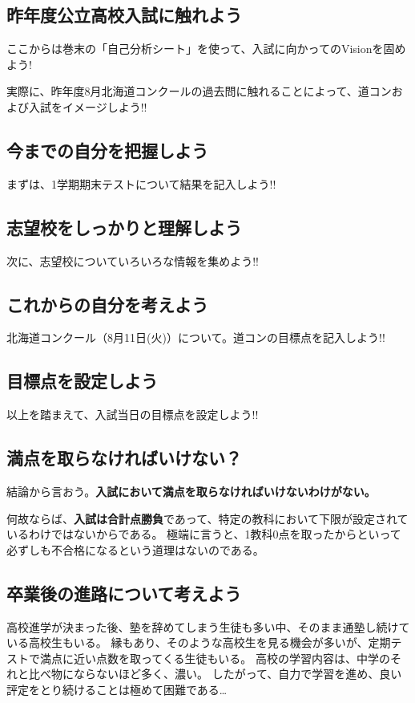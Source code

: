   \subsection{\textbf{昨年度公立高校入試に触れよう}}
    ここからは巻末の「自己分析シート」を使って、入試に向かってのVisionを固めよう!

    実際に、昨年度8月北海道コンクールの過去問に触れることによって、道コンおよび入試をイメージしよう!!

  \subsection{\textbf{今までの自分を把握しよう}}
    まずは、1学期期末テストについて結果を記入しよう!!

  \subsection{\textbf{志望校をしっかりと理解しよう}}
    次に、志望校についていろいろな情報を集めよう!!

\subsection{\textbf{これからの自分を考えよう}}
    北海道コンクール（8月11日(火)）について。道コンの目標点を記入しよう!!

  \subsection{\textbf{目標点を設定しよう}}
  以上を踏まえて、入試当日の目標点を設定しよう!!

\subsection{\textbf{満点を取らなければいけない？}}
  結論から言おう。\textbf{入試において満点を取らなければいけないわけがない。}

  何故ならば、\textbf{入試は合計点勝負}であって、特定の教科において下限が設定されているわけではないからである。
  極端に言うと、1教科0点を取ったからといって必ずしも不合格になるという道理はないのである。

\subsection{\textbf{卒業後の進路について考えよう}}
  高校進学が決まった後、塾を辞めてしまう生徒も多い中、そのまま通塾し続けている高校生もいる。
  縁もあり、そのような高校生を見る機会が多いが、定期テストで満点に近い点数を取ってくる生徒もいる。
  高校の学習内容は、中学のそれと比べ物にならないほど多く、濃い。
  したがって、自力で学習を進め、良い評定をとり続けることは極めて困難である…

  \newpage
